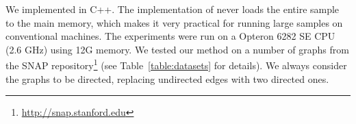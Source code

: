 \begin{table}[ht]
\centering
{}
\caption{\scriptsize The datasets, corresponding statistics, and the rate of generating new items at each step.}\label{table:datasets}
\end{table}

 We implemented \algonameapx in C++. The implementation of \algonameapx never loads the entire sample
to the main memory, which makes it very practical for running large samples on
conventional machines. The experiments were run on a Opteron 6282 SE CPU (2.6
GHz) using 12G memory. We tested our method on a number of graphs from the
SNAP repository\footnote{\url{http://snap.stanford.edu}} (see
Table~\ref{table:datasets} for details). We always consider the graphs to be
directed, replacing undirected edges with two directed ones. 

